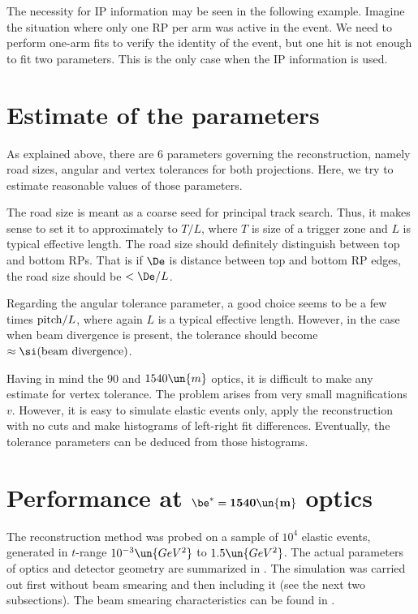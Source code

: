 The necessity for IP information may be seen in the following example. Imagine the situation where only one RP per arm was active in the event. We need to perform one-arm fits to verify the identity of the event, but one hit is not enough to fit two parameters. This is the only case when the IP information is used.

\section[estim]{Estimate of the parameters}

As explained above, there are 6 parameters governing the reconstruction, namely road sizes, angular and vertex tolerances for both projections. Here, we try to estimate reasonable values of those parameters.

The road size is meant as a coarse seed for principal track search. Thus, it makes sense to set it to approximately to $T/L$, where $T$ is size of a trigger zone and $L$ is typical effective length. The road size should definitely distinguish between top and bottom RPs. That is if $\De$ is distance between top and bottom RP edges, the road size should be $< \De / L$.

Regarding the angular tolerance parameter, a good choice seems to be a few times ${\rm pitch}/L$, where again $L$ is a typical effective length. However, in the case when beam divergence is present, the tolerance should become $\approx \si({\rm beam\ divergence})$.

Having in mind the $90$ and $1540\un{m}$ optics, it is difficult to make any estimate for vertex tolerance. The problem arises from very small magnifications $v$. However, it is easy to simulate elastic events only, apply the reconstruction with no cuts and make histograms of left-right fit differences. Eventually, the tolerance parameters can be deduced from those histograms.


\section[1540]{Performance at $\mathbf{\be^*=1540\un{m}}$ optics}

The reconstruction method was probed on a sample of $10^4$ elastic events, generated in $t$-range $10^{-3}\un{GeV^2}$ to $1.5\un{GeV^2}$. The actual parameters of optics and detector geometry are summarized in . The simulation was carried out first without beam smearing and then including it (see the next two subsections). The beam smearing characteristics can be found in .

